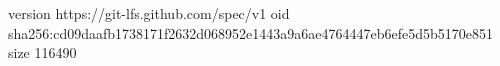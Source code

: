 version https://git-lfs.github.com/spec/v1
oid sha256:cd09daafb1738171f2632d068952e1443a9a6ae4764447eb6efe5d5b5170e851
size 116490
